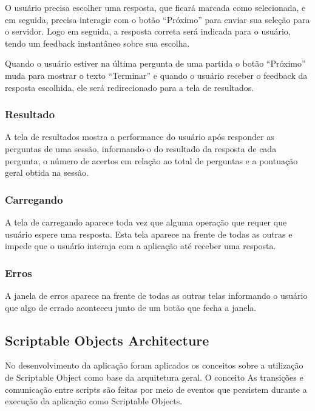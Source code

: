 O usuário precisa escolher uma resposta, que ficará marcada como selecionada, e em seguida, precisa interagir com o botão “Próximo” para enviar sua seleção para o servidor. Logo em seguida, a resposta correta será indicada para o usuário, tendo um feedback instantâneo sobre sua escolha.

Quando o usuário estiver na última pergunta de uma partida o botão “Próximo” muda para mostrar o texto “Terminar” e quando o usuário receber o feedback da resposta escolhida, ele será redirecionado para a tela de resultados.


\subsubsection{Resultado}
\label{subsubsec:resultado}

A tela de resultados mostra a performance do usuário após responder as perguntas de uma sessão, informando-o do resultado da resposta de cada pergunta, o número de acertos em relação ao total de perguntas e a pontuação geral obtida na sessão.


\subsubsection{Carregando}
\label{subsubsec:carregando}

A tela de carregando aparece toda vez que alguma operação que requer que usuário espere uma resposta. Esta tela aparece na frente de todas as outras e impede que o usuário interaja com a aplicação até receber uma resposta.


\subsubsection{Erros}
\label{subsubsec:erros}

A janela de erros aparece na frente de todas as outras telas informando o usuário que algo de errado aconteceu junto de um botão que fecha a janela.

\subsection{Scriptable Objects Architecture}
\label{subsec:scriptableobjectsarch}

No desenvolvimento da aplicação foram aplicados os conceitos sobre a utilização de Scriptable Object como base da arquitetura geral. O conceito
As transições e comunicação entre scripts são feitas por meio de eventos que persistem durante a execução da aplicação como Scriptable Objects.

